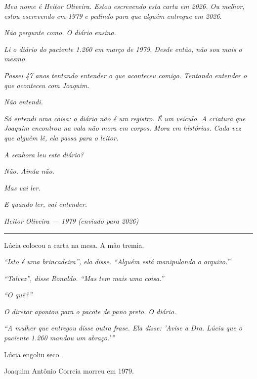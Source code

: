 \noindent \textit{Meu nome é Heitor Oliveira. Estou escrevendo esta carta em 2026. Ou melhor, estou escrevendo em 1979 e pedindo para que alguém entregue em 2026.}

\noindent \textit{Não pergunte como. O diário ensina.}

\noindent \textit{Li o diário do paciente 1.260 em março de 1979. Desde então, não sou mais o mesmo.}

\noindent \textit{Passei 47 anos tentando entender o que aconteceu comigo. Tentando entender o que aconteceu com Joaquim.}

\noindent \textit{Não entendi.}

\noindent \textit{Só entendi uma coisa: o diário não é um registro. É um veículo. A criatura que Joaquim encontrou na vala não mora em corpos. Mora em histórias. Cada vez que alguém lê, ela passa para o leitor.}

\noindent \textit{A senhora leu este diário?}

\noindent \textit{Não. Ainda não.}

\noindent \textit{Mas vai ler.}

\noindent \textit{E quando ler, vai entender.}

\noindent \textit{Heitor Oliveira}
\textit{--- 1979 (enviado para 2026)}

\vspace{0.5em}\noindent\rule{\textwidth}{0.5pt}\vspace{0.5em}

\noindent Lúcia colocou a carta na mesa. A mão tremia.

\noindent \textit{\textquotedblleft{}Isto é uma brincadeira\textquotedblright{}\textit{, ela disse. }\textquotedblleft{}Alguém está manipulando o arquivo.\textquotedblright{}}

\noindent \textit{\textquotedblleft{}Talvez\textquotedblright{}\textit{, disse Ronaldo. }\textquotedblleft{}Mas tem mais uma coisa.\textquotedblright{}}

\noindent \textit{\textquotedblleft{}O quê?\textquotedblright{}}

\noindent \textit{O diretor apontou para o pacote de pano preto. O diário.}

\noindent \textit{\textquotedblleft{}A mulher que entregou disse outra frase. Ela disse: 'Avise a Dra. Lúcia que o paciente 1.260 mandou um abraço.'\textquotedblright{}}

\noindent Lúcia engoliu seco.

\noindent Joaquim Antônio Correia morreu em 1979.

